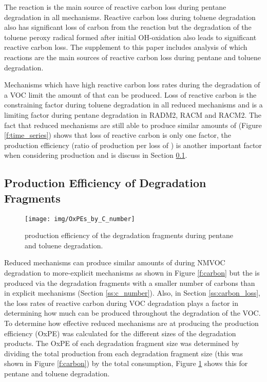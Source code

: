 The  reaction is the main source of reactive carbon loss during pentane degradation in all mechanisms.
Reactive carbon loss during toluene degradation also has significant loss of carbon from the  reaction but the degradation of the toluene peroxy radical formed after initial OH-oxidation also leads to significant reactive carbon loss.
The supplement to this paper includes analysis of which reactions are the main sources of reactive carbon loss during pentane and toluene degradation.

Mechanisms which have high reactive carbon loss rates during the degradation of a VOC limit the amount of  that can be produced.
Loss of reactive carbon is the constraining factor during toluene degradation in all reduced mechanisms and is a limiting factor during pentane degradation in RADM2, RACM and RACM2.
The fact that reduced mechanisms are still able to produce similar amounts of  (Figure \ref{f:time_series}) shows that loss of reactive carbon is only one factor, the  production efficiency (ratio of  production per loss of ) is another important factor when considering  production and is discuss in Section \ref{ss:OxPE}.

\subsection[Ox Production Efficiency of Degradation Fragments]{ Production Efficiency of Degradation Fragments} \label{ss:OxPE}

\begin{figure}
    \centering
    \texttt{[image: img/OxPEs\_by\_C\_number]}
    \vspace{0mm}
    \caption{ production efficiency of the degradation fragments during pentane and toluene degradation.}
    \vspace{-4mm}
    \label{f:OxPE}
\end{figure}

Reduced mechanisms can produce similar amounts of  during NMVOC degradation to more-explicit mechanisms as shown in Figure \ref{f:carbon} but the  is produced via the degradation fragments with a smaller number of carbons than in explicit mechanisms (Section \ref{ss:c_number}).
Also, in Section \ref{ss:carbon_loss}, the loss rates of reactive carbon during VOC degradation plays a factor in determining how much  can be produced throughout the degradation of the VOC.
To determine how effective reduced mechanisms are at producing  the  production efficiency (OxPE) was calculated for the different sizes of the degradation products.
The OxPE of each degradation fragment size was determined by dividing the total  production from each degradation fragment size (this was shown in Figure \ref{f:carbon}) by the total  consumption, Figure \ref{f:OxPE} shows this for pentane and toluene degradation.


